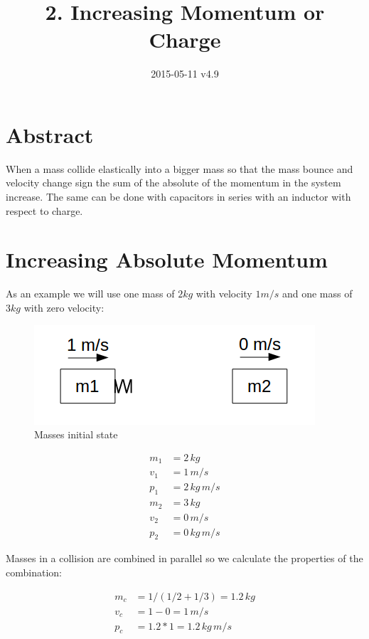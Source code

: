 \documentclass[]{../common/elementary-physics}
\title{2. Increasing Momentum or Charge}
\date{2015-05-11 v4.9}
\begin{document}
\maketitle

\tableofcontents

\section{Abstract}

When a mass collide elastically into a bigger mass so that the mass bounce and velocity change sign the sum of the absolute of the momentum in the system increase.
The same can be done with capacitors in series with an inductor with respect to charge.

\section{Increasing Absolute Momentum}

As an example we will use one mass of $2 kg$ with velocity $1 m/s$ and one mass of $3 kg$ with zero velocity:

\begin{figure}[ht] \centering
	\includegraphics[scale=.5]{mms4} \caption{Masses initial state}
\end{figure}

\begin{subequations}
\begin{align}
m_1 &= 2 \, kg \\
v_1 &= 1 \, m/s \\
p_1 &= 2 \, kg \, m/s \\
m_2 &= 3 \, kg \\
v_2 &= 0 \, m/s \\
p_2 &= 0 \, kg \, m/s
\end{align}
\end{subequations}

Masses in a collision are combined in parallel\cite{ef1ch} so we calculate the properties of the combination:

\begin{subequations}
\begin{align}
m_c &= 1/(1/2 + 1/3) = 1.2 \, kg \\
v_c &= 1 - 0 = 1 \, m/s \\
p_c &= 1.2 * 1 = 1.2 \, kg \, m/s
\end{align}
\end{subequations}
\end{document}
